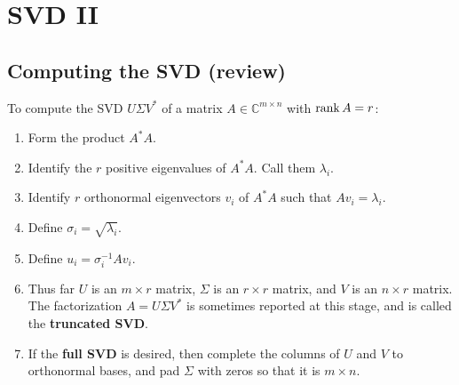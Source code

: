 \chapter{SVD II}
\section{Computing the SVD (review)}
To compute the SVD \(U\Sigma V^*\) of a matrix \(A \in \mathbb{C}^{m\times n}\) with \(\rank A = r\):
\begin{enumerate}
  \item Form the product \(A^*A\).
  \item Identify the \(r\) positive eigenvalues of \(A^*A\). Call them \(\lambda_i\).
  \item Identify \(r\) orthonormal eigenvectors \(v_i\) of \(A^*A\) such that \(A v_i = \lambda_i\).
  \item Define \(\sigma_i = \sqrt{\lambda_i}\).
  \item Define \(u_i = \sigma_i^{-1} A v_i\).
  \item Thus far \(U\) is an \(m\times r\) matrix, \(\Sigma\) is an \(r \times r\) matrix, and \(V\) is an \(n \times r\) matrix. The factorization \(A = U \Sigma V^*\) is sometimes reported at this stage, and is called the \textbf{truncated SVD}.
  \item If the \textbf{full SVD} is desired, then complete the columns of \(U\) and \(V\) to orthonormal bases, and pad \(\Sigma\) with zeros so that it is \(m \times n\).
\end{enumerate}

